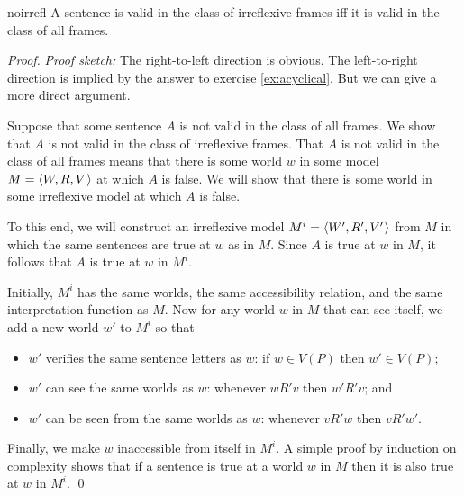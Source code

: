 \begin{observation}{noirrefl}
  A sentence is valid in the class of irreflexive frames iff it is valid in the
  class of all frames.
\end{observation}
%
\begin{proof}
  \emph{Proof sketch:} The right-to-left direction is obvious. The left-to-right direction is implied by the answer to exercise \ref{ex:acyclical}.
  But we can give a more direct argument.

  Suppose that some sentence $A$ is not valid in the class of all frames. We
  show that $A$ is not valid in the class of irreflexive frames. That $A$ is not
  valid in the class of all frames means that there is some world $w$ in some
  model $M = \t{W,R,V}$ at which $A$ is false. We will show that there is some
  world in some irreflexive model at which $A$ is false.

  To this end, we will construct an irreflexive model $M^i = \t{W',R',V'}$ from
  $M$ in which the same sentences are true at $w$ as in $M$. Since $A$ is true
  at $w$ in $M$, it follows that $A$ is true at $w$ in $M^i$.

  Initially, $M^i$ has the same worlds, the same accessibility relation, and the
  same interpretation function as $M$. Now for any world $w$ in $M$ that can see
  itself, we add a new world $w'$ to $M^i$ so that
  \begin{itemize}[leftmargin=10mm]
    \itemsep-1mm
    \item $w'$ verifies the same sentence letters as $w$: if $w \in V(P)$ then $w' \in V(P)$;
    \item $w'$ can see the same worlds as $w$: whenever $wR'v$ then $w'R'v$; and
    \item $w'$ can be seen from the same worlds as $w$: whenever $vR'w$ then
          $vR'w'$.
  \end{itemize}
  Finally, we make $w$ inaccessible from itself in $M^i$. A simple proof
  by induction on complexity shows that if a sentence is true at a
  world $w$ in $M$ then it is also true at $w$ in $M^i$.
  \qed

\end{proof}

